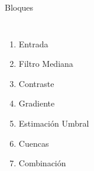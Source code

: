 \documentclass[15pt]{beamer} %
\begin{document}
\begin{frame}{Bloques}
  \begin{columns}
    \begin{enumerate}
    \item <1-| alert@1> Entrada
    \item <2-| alert@2> Filtro Mediana
    \item <3-| alert@3> Contraste
    \item <4-| alert@4> Gradiente
    \item <5-| alert@5> Estimación Umbral
    \item <6-| alert@6> Cuencas
    \item <7-| alert@6> Combinación
    \end{enumerate}

\end{columns}
\end{frame}
\end{document}
